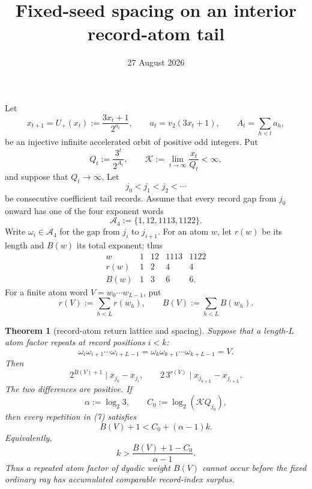 \documentclass[11pt]{article}
\title{Fixed-seed spacing on an interior record-atom tail}
\author{}
\date{27 August 2026}
\newtheorem{theorem}{Theorem}
\newcommand{\Up}{U_+}
\begin{document}
\maketitle

Let
\[
 x_{t+1}=\Up(x_t):=\frac{3x_t+1}{2^{a_t}},
 \qquad
 a_t=v_2(3x_t+1),
 \qquad
 A_t=\sum_{h<t}a_h,
 \tag{1}
\]
be an injective infinite accelerated orbit of positive odd integers.  Put
\[
 Q_t:=\frac{3^t}{2^{A_t}},
 \qquad
 \mathcal K:=\lim_{t\to\infty}\frac{x_t}{Q_t}<\infty,
 \tag{2}
\]
and suppose that $Q_t\to\infty$.  Let
\[
 j_0<j_1<j_2<\cdots
 \tag{3}
\]
be consecutive coefficient tail records.  Assume that every record gap
from $j_0$ onward has one of the four exponent words
\[
 \mathcal A_4:=\{1,12,1113,1122\}.
 \tag{4}
\]
Write $\omega_i\in\mathcal A_4$ for the gap from $j_i$ to $j_{i+1}$.
For an atom $w$, let $r(w)$ be its length and $B(w)$ its total exponent;
thus
\[
\begin{array}{c|rrrr}
 w&1&12&1113&1122\\ \hline
 r(w)&1&2&4&4\\
 B(w)&1&3&6&6.
\end{array}
\tag{5}
\]
For a finite atom word $V=w_0\cdots w_{L-1}$, put
\[
 r(V):=\sum_{h<L}r(w_h),
 \qquad
 B(V):=\sum_{h<L}B(w_h).
 \tag{6}
\]

\begin{theorem}[record-atom return lattice and spacing]
Suppose that a length-$L$ atom factor repeats at record positions $i<k$:
\[
 \omega_i\omega_{i+1}\cdots\omega_{i+L-1}
 =
 \omega_k\omega_{k+1}\cdots\omega_{k+L-1}
 =V.
 \tag{7}
\]
Then
\[
\boxed{
 2^{B(V)+1}\mid x_{j_k}-x_{j_i},
 \qquad
 2\,3^{r(V)}\mid x_{j_{k+L}}-x_{j_{i+L}}.}
\tag{8}
\]
The two differences are positive.  If
\[
 \alpha:=\log_2 3,
 \qquad
 C_0:=\log_2(\mathcal KQ_{j_0}),
 \tag{9}
\]
then every repetition in (7) satisfies
\[
\boxed{
 B(V)+1<C_0+(\alpha-1)k.}
\tag{10}
\]
Equivalently,
\[
\boxed{
 k>\frac{B(V)+1-C_0}{\alpha-1}.}
\tag{11}
\]
Thus a repeated atom factor of dyadic weight $B(V)$ cannot occur before
the fixed ordinary ray has accumulated comparable record-index surplus.
\end{theorem}
\end{document}
